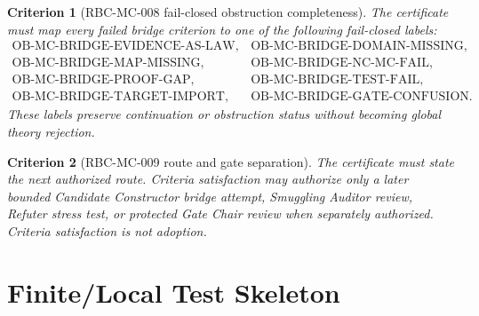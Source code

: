 \documentclass[11pt]{article}
\newtheorem{criterion}{Criterion}
\begin{document}
\begin{criterion}[RBC-MC-008 fail-closed obstruction completeness]
The certificate must map every failed bridge criterion to one of the following
fail-closed labels:
\[
\begin{array}{ll}
\mathrm{OB\mbox{-}MC\mbox{-}BRIDGE\mbox{-}EVIDENCE\mbox{-}AS\mbox{-}LAW}, &
\mathrm{OB\mbox{-}MC\mbox{-}BRIDGE\mbox{-}DOMAIN\mbox{-}MISSING},\\
\mathrm{OB\mbox{-}MC\mbox{-}BRIDGE\mbox{-}MAP\mbox{-}MISSING}, &
\mathrm{OB\mbox{-}MC\mbox{-}BRIDGE\mbox{-}NC\mbox{-}MC\mbox{-}FAIL},\\
\mathrm{OB\mbox{-}MC\mbox{-}BRIDGE\mbox{-}PROOF\mbox{-}GAP}, &
\mathrm{OB\mbox{-}MC\mbox{-}BRIDGE\mbox{-}TEST\mbox{-}FAIL},\\
\mathrm{OB\mbox{-}MC\mbox{-}BRIDGE\mbox{-}TARGET\mbox{-}IMPORT}, &
\mathrm{OB\mbox{-}MC\mbox{-}BRIDGE\mbox{-}GATE\mbox{-}CONFUSION}.
\end{array}
\]
These labels preserve continuation or obstruction status without becoming
global theory rejection.
\end{criterion}

\begin{criterion}[RBC-MC-009 route and gate separation]
The certificate must state the next authorized route. Criteria satisfaction
may authorize only a later bounded Candidate Constructor bridge attempt,
Smuggling Auditor review, Refuter stress test, or protected Gate Chair review
when separately authorized. Criteria satisfaction is not adoption.
\end{criterion}

\section{Finite/Local Test Skeleton}
\end{document}
